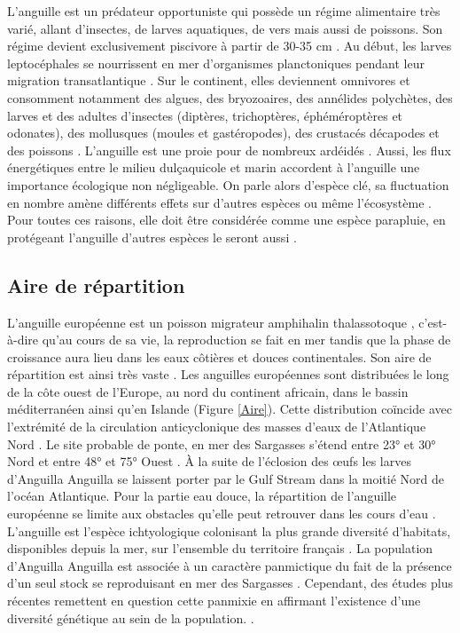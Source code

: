 \documentclass[11pt,titlepage,twoside]{article}\usepackage[]{graphicx}\usepackage[table]{xcolor}
\begin{document}
L’anguille est un prédateur opportuniste qui possède un régime alimentaire très varié, allant d’insectes, de larves aquatiques, de vers mais aussi de poissons. Son régime devient exclusivement piscivore à partir de 30-35 cm \citep{feunteun_commercially_2011}. Au début, les larves leptocéphales se nourrissent en mer d’organismes planctoniques pendant leur migration transatlantique \citep{riemann_qualitative_2010}. 
Sur le continent, elles deviennent omnivores et consomment notamment des algues, des bryozoaires, des annélides polychètes, des larves et des adultes d’insectes (diptères, trichoptères, éphéméroptères et odonates), des mollusques (moules et gastéropodes), des crustacés décapodes et des poissons \citep{pasquaud_determination_2010, jobling_eel_2003}. L’anguille est une proie pour de nombreux ardéidés \citep{feunteun_assessement_1994}.
Aussi, les flux énergétiques entre le milieu dulçaquicole et marin accordent à l’anguille une importance écologique non négligeable. On parle alors d’espèce clé, sa fluctuation en nombre amène différents effets sur d’autres espèces ou même l’écosystème \citep{willson_anadromous_1995}. Pour toutes ces raisons, elle doit être considérée comme une espèce parapluie, en protégeant l’anguille d’autres espèces le seront aussi \citep{baisez_outil_2005}.

\subsection{Aire de répartition}
	
L’anguille européenne est un poisson migrateur amphihalin thalassotoque \citep{adam_anguille_2008, brusle_anguille_1994, elie_migration_1994}, c’est- à-dire qu’au cours de sa vie, la reproduction se fait en mer tandis que la phase de croissance aura lieu dans les eaux côtières et douces continentales. Son aire de répartition est ainsi très vaste \citep{durif_migration_2003}. Les anguilles européennes sont distribuées le long de la côte ouest de l’Europe, au nord du continent africain, dans le bassin méditerranéen ainsi qu’en Islande (Figure \ref{Aire}). Cette distribution coïncide avec l’extrémité de la circulation anticyclonique des masses d’eaux de l’Atlantique Nord \citep{anthony_bases_2006}. Le site probable de ponte, en mer des Sargasses s’étend entre 23° et 30° Nord et entre 48° et 75° Ouest \citep{mccleave_reproductive_1987}. À la suite de l’éclosion des œufs les larves d’Anguilla Anguilla se laissent porter par le Gulf Stream dans la moitié Nord de l’océan Atlantique. Pour la partie eau douce, la répartition de l’anguille européenne se limite aux obstacles qu’elle peut retrouver dans les cours d’eau \citep{adam_anguille_1997}. L’anguille est l’espèce ichtyologique colonisant la plus grande diversité d’habitats, disponibles depuis la mer, sur l’ensemble du territoire français \citep{laffaille_spatial_2003, laffaille_habitat_2004}. La population d’Anguilla Anguilla est associée à un caractère panmictique du fait de la présence d’un seul stock se reproduisant en mer des Sargasses \citep{schmidt_ivbreeding_1922}. Cependant, des études plus récentes remettent en question cette panmixie en affirmant l’existence d’une diversité génétique au sein de la population. \citep{farrugio_etat_2011, pujolar_genetic_2007, daemen_analysis_2001}.
\end{document}
